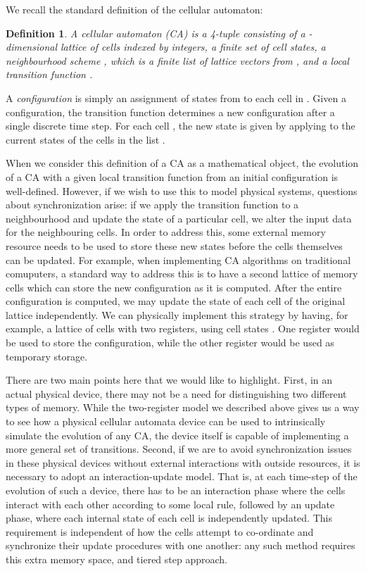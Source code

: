 \documentclass{jca}
\newtheorem{definition}{Definition}
\begin{document}
We recall the standard definition of the cellular automaton:
\begin{definition}
A cellular automaton (CA) is a 4-tuple  consisting of a -dimensional lattice of cells  indexed by integers, a finite set  of cell states, a neighbourhood scheme , which is a finite list of lattice vectors from , and a local transition function .
\end{definition}
A {\em configuration} is simply an assignment of states from  to each cell in .
Given a configuration, the transition function  determines a new configuration after a single discrete time step.
For each cell , the new state is given by applying  to the current states of the cells in the list .

When we consider this definition of a CA as a mathematical object, the evolution of a CA with a given local transition function  from an initial configuration is well-defined.
However, if we wish to use this to model physical systems, questions about synchronization arise: if we apply the transition function  to a neighbourhood and update the state of a particular cell, we alter the input data for the neighbouring cells.
In order to address this, some external memory resource needs to be used to store these new states before the cells themselves can be updated.
For example, when implementing CA algorithms on traditional comuputers, a standard way to address this is to have a second lattice of memory cells which can store the new configuration as it is computed.
After the entire configuration is computed, we may update the state of each cell of the original lattice independently.\cite{weimar}
We can physically implement this strategy by having, for example, a lattice of cells with two registers, using cell states .
One register would be used to store the configuration, while the other register would be used as temporary storage.

There are two main points here that we would like to highlight.
First, in an actual physical device, there may not be a need for distinguishing two different types of memory.
While the two-register model we described above gives us a way to see how a physical cellular automata device can be used to intrinsically simulate the evolution of any CA, the device itself is capable of implementing a more general set of transitions.
Second, if we are to avoid synchronization issues in these physical devices without external interactions with outside resources, it is necessary to adopt an interaction-update model.
That is, at each time-step of the evolution of such a device, there has to be an interaction phase where the cells interact with each other according to some local rule, followed by an update phase, where each internal state of each cell is independently updated.
This requirement is independent of how the cells attempt to co-ordinate and synchronize their update procedures with one another: any such method requires this extra memory space, and tiered step approach.
\end{document}
